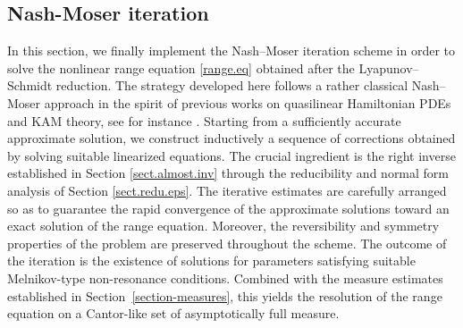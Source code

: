 \documentclass[a4paper,reqno,10pt]{article}
\begin{document}
\subsection{Nash-Moser iteration}\label{section.NASH}
In this section, we finally implement the Nash--Moser iteration scheme in order to solve the nonlinear range equation \eqref{range.eq} obtained after the Lyapunov--Schmidt reduction. 
The strategy developed here follows a rather classical Nash--Moser approach in the spirit of previous works on quasilinear Hamiltonian PDEs and KAM theory, see for instance  \cite{Berti-Bolle}. Starting from a sufficiently accurate approximate solution, we construct inductively a sequence of corrections obtained by solving suitable linearized equations. The crucial ingredient is the right inverse established in Section \ref{sect.almost.inv} through the reducibility and normal form analysis of Section \ref{sect.redu.eps}.
 The iterative estimates are carefully arranged so as to guarantee the rapid convergence of the approximate solutions toward an exact solution of the range equation. Moreover, the reversibility and symmetry properties of the problem are preserved throughout the scheme.
The outcome of the iteration is the existence of solutions for parameters satisfying suitable Melnikov-type non-resonance conditions. Combined with the measure estimates established in Section~\ref{section-measures}, this yields the resolution of the range equation on a Cantor-like set of asymptotically full measure.

\medskip
\end{document}
